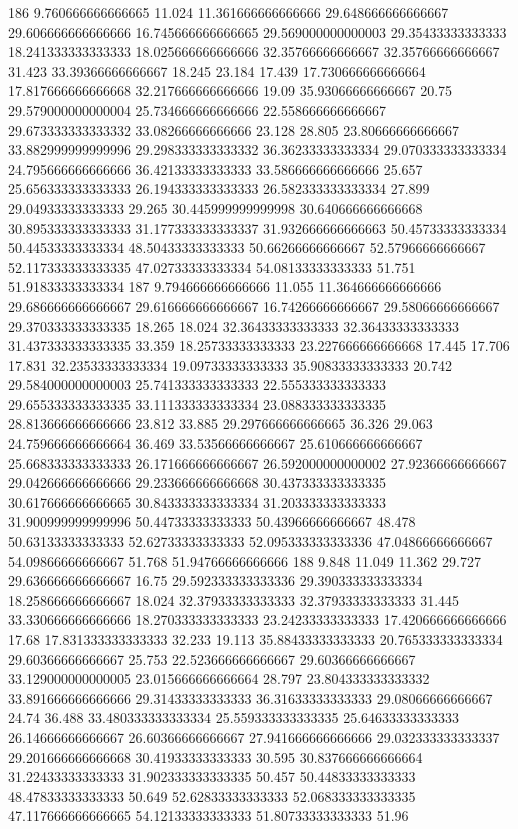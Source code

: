 186 9.760666666666665 11.024 11.361666666666666 29.648666666666667 29.606666666666666 16.745666666666665 29.569000000000003 29.35433333333333 18.241333333333333 18.025666666666666 32.35766666666667 32.35766666666667 31.423 33.39366666666667 18.245 23.184 17.439 17.730666666666664 17.817666666666668 32.217666666666666 19.09 35.93066666666667 20.75 29.579000000000004 25.734666666666666 22.558666666666667 29.673333333333332 33.08266666666666 23.128 28.805 23.80666666666667 33.882999999999996 29.298333333333332 36.36233333333334 29.070333333333334 24.795666666666666 36.42133333333333 33.586666666666666 25.657 25.656333333333333 26.194333333333333 26.582333333333334 27.899 29.04933333333333 29.265 30.445999999999998 30.640666666666668 30.895333333333333 31.177333333333337 31.932666666666663 50.45733333333334 50.44533333333334 48.50433333333333 50.66266666666667 52.57966666666667 52.117333333333335 47.02733333333334 54.08133333333333 51.751 51.91833333333334
187 9.794666666666666 11.055 11.364666666666666 29.686666666666667 29.616666666666667 16.74266666666667 29.58066666666667 29.370333333333335 18.265 18.024 32.36433333333333 32.36433333333333 31.437333333333335 33.359 18.25733333333333 23.227666666666668 17.445 17.706 17.831 32.23533333333334 19.09733333333333 35.90833333333333 20.742 29.584000000000003 25.741333333333333 22.555333333333333 29.655333333333335 33.111333333333334 23.088333333333335 28.813666666666666 23.812 33.885 29.297666666666665 36.326 29.063 24.759666666666664 36.469 33.53566666666667 25.610666666666667 25.668333333333333 26.171666666666667 26.592000000000002 27.92366666666667 29.042666666666666 29.233666666666668 30.437333333333335 30.617666666666665 30.843333333333334 31.203333333333333 31.900999999999996 50.44733333333333 50.43966666666667 48.478 50.63133333333333 52.62733333333333 52.095333333333336 47.04866666666667 54.09866666666667 51.768 51.94766666666666
188 9.848 11.049 11.362 29.727 29.636666666666667 16.75 29.592333333333336 29.390333333333334 18.258666666666667 18.024 32.37933333333333 32.37933333333333 31.445 33.330666666666666 18.270333333333333 23.24233333333333 17.420666666666666 17.68 17.831333333333333 32.233 19.113 35.88433333333333 20.765333333333334 29.60366666666667 25.753 22.523666666666667 29.60366666666667 33.129000000000005 23.015666666666664 28.797 23.804333333333332 33.891666666666666 29.31433333333333 36.31633333333333 29.08066666666667 24.74 36.488 33.480333333333334 25.559333333333335 25.64633333333333 26.14666666666667 26.60366666666667 27.941666666666666 29.032333333333337 29.201666666666668 30.41933333333333 30.595 30.837666666666664 31.22433333333333 31.902333333333335 50.457 50.44833333333333 48.47833333333333 50.649 52.62833333333333 52.068333333333335 47.117666666666665 54.12133333333333 51.80733333333333 51.96
